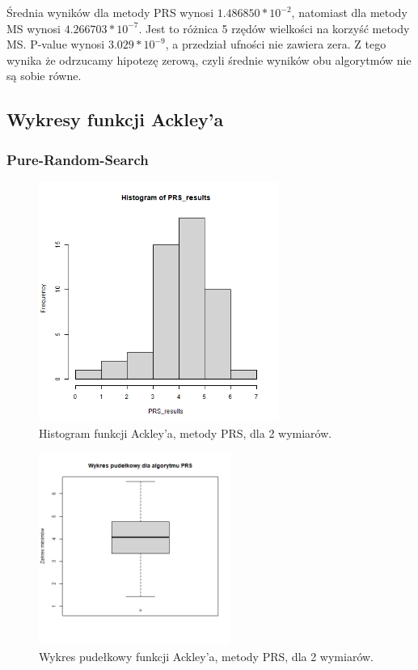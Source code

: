 \documentclass{lab}
\begin{document}
Średnia wyników dla metody PRS wynosi $1.486850*10^{-2}$, natomiast dla metody MS wynosi $4.266703*10^{-7}$. Jest to różnica 5 rzędów wielkości na korzyść metody MS. P-value wynosi $3.029*10^{-9}$, a przedział ufności nie zawiera zera. Z tego wynika że odrzucamy hipotezę zerową, czyli średnie wyników obu algorytmów nie są sobie równe.

\subsection{Wykresy funkcji Ackley’a}
\subsubsection{Pure-Random-Search}
\begin{figure}[H]
  \centering
  \includegraphics[width=0.7\textwidth]{img/dim2_PRS_Ackley_his.png}
  \caption{Histogram funkcji Ackley'a, metody PRS, dla 2 wymiarów.}
\end{figure}
\begin{figure}[H]
  \centering
  \includegraphics[width=0.56\textwidth]{img/dim2_PRS_Ackley.png}
  \caption{Wykres pudełkowy funkcji Ackley'a, metody PRS, dla 2 wymiarów.}
\end{figure}
\end{document}
